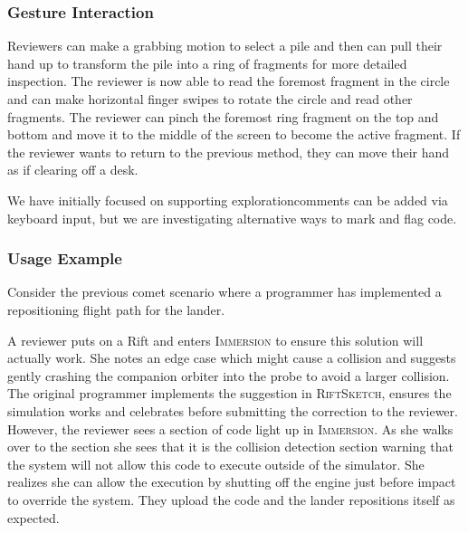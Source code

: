\documentclass[conference]{IEEEtran}
\begin{document}

\subsubsection{Gesture Interaction}

Reviewers can make a grabbing motion to select a pile and then can pull their hand up to transform the pile into a ring of fragments for more detailed inspection.
The reviewer is now able to read the foremost fragment in the circle and can make horizontal finger swipes to rotate the circle and read other fragments. 
The reviewer can pinch the foremost ring fragment on the top and bottom and move it to the middle of the screen to become the active fragment.
If the reviewer wants to return to the previous method, they can move their hand as if clearing off a desk.

We have initially focused on supporting exploration\textemdash comments can be added via keyboard input, but we are investigating alternative ways to mark and flag code.


\subsubsection{Usage Example}

Consider the previous comet scenario where a programmer has implemented a repositioning flight path for the lander.

A reviewer puts on a Rift and enters \textsc{Immersion} to ensure this solution will actually work.
She notes an edge case which might cause a collision and suggests gently crashing the companion orbiter into the probe to avoid a larger collision.
The original programmer implements the suggestion in \textsc{RiftSketch}, ensures the simulation works and celebrates before submitting the correction to the reviewer.
However, the reviewer sees a section of code light up in \textsc{Immersion}.
As she walks over to the section she sees that it is the collision detection section warning that the system will not allow this code to execute outside of the simulator.
She realizes she can allow the execution by shutting off the engine just before impact to override the system.
They upload the code and the lander repositions itself as expected.
\end{document}
